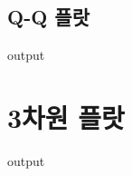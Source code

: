 \subsection{Q-Q 플랏}
\begin{Schunk}
\begin{Soutput}
output
\end{Soutput}
\end{Schunk}

\section{3차원 플랏}

\begin{Schunk}
\begin{Soutput}
output
\end{Soutput}
\end{Schunk}

